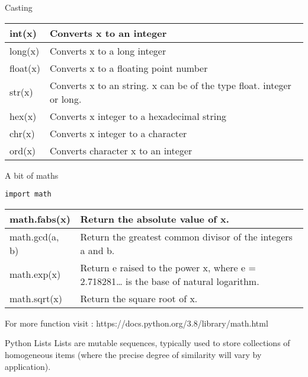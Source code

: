 \documentclass{beamer}
\begin{document}
\begin{frame}{Casting}
	\begin{center}
	\begin{table}
		\begin{tabular}{|l|p{8cm}|}
		\hline
		int(x) & Converts x to an integer \\
		\hline
		long(x) & Converts x to a long integer \\
		\hline
		float(x) & Converts x to a floating point number \\
		\hline
		str(x) & Converts x to an string. x can be of the type float. integer or long. \\
		\hline
		hex(x) & Converts x integer to a hexadecimal string \\
		\hline
		chr(x) & Converts x integer to a character \\
		\hline
		ord(x) & Converts character x to an integer \\
		\hline
	\end{tabular}
	\end{table}
	\end{center}
\end{frame}

\begin{frame}[fragile]{A bit of maths}
	\begin{verbatim}
import math
	\end{verbatim}
	
	\begin{center}
	\begin{table}
	\begin{tabular}{|l|p{7cm}|}
		\hline
		math.fabs(x) &
		Return the absolute value of x. \\
		\hline
		math.gcd(a, b) &
		Return the greatest common divisor of the integers a and b. \\
		\hline
		math.exp(x) &
		Return e raised to the power x, where e = 2.718281… is the base of natural logarithm. \\
		\hline
		math.sqrt(x) & 
		Return the square root of x. \\
		\hline
	\end{tabular}
	\end{table}
	\end{center}
	For more function visit : 
	https://docs.python.org/3.8/library/math.html
\end{frame}

\begin{frame}{Python Lists}
	Lists are mutable sequences, typically used to store collections of homogeneous items (where the precise degree of similarity will vary by application).
\end{frame}
\end{document}
